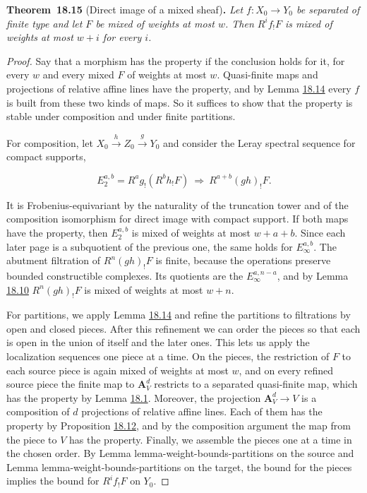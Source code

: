 \documentclass[11pt]{article}
\newenvironment{bpstatement}[2]{\par\addvspace{0.6\baselineskip}\noindent\textbf{#1}#2\textbf{.}\enspace\ignorespaces}
  {\par\addvspace{0.4\baselineskip}}
\newenvironment{bpstatementit}[2]{\begin{bpstatement}{#1}{#2}\itshape\ignorespaces}{\end{bpstatement}}
\begin{document}
\label{bp45}%
\begin{bpstatementit}{Theorem~18.15}{ (Direct image of a mixed sheaf)}
Let \(f:X_0\to Y_0\) be separated of finite type and let \(F\) be mixed of weights at most \(w\). Then \(R^if_!F\) is mixed of weights at most \(w+i\) for every \(i\).
\end{bpstatementit}

\begin{proof}[{Proof}]\label{bp46}%
Say that a morphism has the property if the conclusion holds for it, for every \(w\) and every mixed \(F\) of weights at most \(w\). Quasi-finite maps and projections of relative affine lines have the property, and by Lemma \hyperref[bp42]{18.14} every \(f\) is built from these two kinds of maps. So it suffices to show that the property is stable under composition and under finite partitions.

For composition, let \(X_0\xrightarrow{h}Z_0\xrightarrow{g}Y_0\) and consider the Leray spectral sequence for compact supports,

\[
E_2^{a,b}=R^ag_!(R^bh_!F)\ \Longrightarrow\ R^{a+b}(gh)_!F.
\]

It is Frobenius-equivariant by the naturality of the truncation tower and of the composition isomorphism for direct image with compact support. If both maps have the property, then \(E_2^{a,b}\) is mixed of weights at most \(w+a+b\). Since each later page is a subquotient of the previous one, the same holds for \(E_\infty^{a,b}\). The abutment filtration of \(R^n(gh)_!F\) is finite, because the operations preserve bounded constructible complexes. Its quotients are the \(E_\infty^{a,n-a}\), and by Lemma \hyperref[bp33]{18.10} \(R^n(gh)_!F\) is mixed of weights at most \(w+n\).

For partitions, we apply Lemma \hyperref[bp42]{18.14} and refine the partitions to filtrations by open and closed pieces. After this refinement we can order the pieces so that each is open in the union of itself and the later ones. This lets us apply the localization sequences one piece at a time. On the pieces, the restriction of \(F\) to each source piece is again mixed of weights at most \(w\), and on every refined source piece the finite map to \(\mathbf A^d_V\) restricts to a separated quasi-finite map, which has the property by Lemma \hyperref[bp5]{18.1}. Moreover, the projection \(\mathbf A^d_V\to V\) is a composition of \(d\) projections of relative affine lines. Each of them has the property by Proposition \hyperref[bp38]{18.12}, and by the composition argument the map from the piece to \(V\) has the property. Finally, we assemble the pieces one at a time in the chosen order. By Lemma lemma-weight-bounds-partitions on the source and Lemma lemma-weight-bounds-partitions on the target, the bound for the pieces implies the bound for \(R^if_!F\) on \(Y_0\).
\end{proof}
\end{document}
